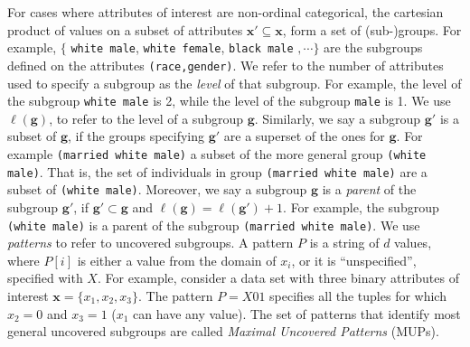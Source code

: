 \documentclass[11pt]{article}
\newcommand{\gee}{\mathbf{g}}
\begin{document}
For cases where attributes of interest are non-ordinal categorical,
the cartesian product of values on a subset of attributes $\mathbf{x}'\subseteq \mathbf{x}$, form a set of (sub-)groups.
For example, $\{$ {\tt white male}, {\tt white female}, {\tt black male} $,\cdots\}$ are the subgroups defined on the attributes {\tt (race,gender)}.
We refer to the number of attributes used to specify a subgroup as the {\it level} of that subgroup.
For example, the level of the subgroup {\tt white male} is 2, while the level of the subgroup {\tt male} is 1.
We use $\ell(\gee)$, to refer to the level of a subgroup $\gee$.
Similarly, we say a subgroup $\gee'$ is a subset of $\gee$, if the groups specifying $\gee'$ are a superset of the ones for $\gee$. For example {\tt (married white male)} a subset of the more general group {\tt (white male)}. That is, the set of individuals in group {\tt (married white male)} are a subset of {\tt (white male)}.
Moreover, we say a subgroup $\gee$ is a {\it parent} of the subgroup $\gee'$, if $\gee'\subset \gee$ and $\ell(\gee)=\ell(\gee')+1$. For example, the subgroup {\tt (white male)} is a parent of the subgroup {\tt (married white male)}.
We use \textit{patterns} to refer to uncovered subgroups.
A pattern $P$ is a string of $d$ values, where $P[i]$ is either a value from the domain of $x_i$, or it is ``unspecified'', specified with $X$. 
For example, consider a data set with three binary attributes of interest $\mathbf{x}=\{x_1, x_2, x_3\}$. The pattern $P=X01$ specifies all the tuples for which $x_2=0$ and $x_3=1$ ($x_1$ can have any value).
The set of patterns that identify most general uncovered subgroups are called {\it Maximal Uncovered Patterns} (MUPs).
\end{document}
